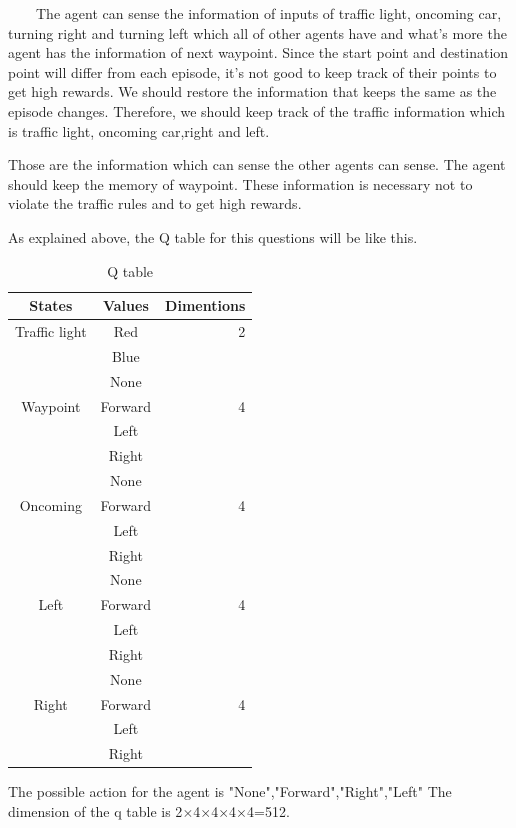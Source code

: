 \documentclass[a4paper,11pt]{article}
\begin{document}
\ \ \ \ The agent can sense the information of inputs of traffic light, oncoming car, turning right and turning left which all of other agents have and what's more the agent has the information of next waypoint.
Since the start point and destination point will differ from each episode, it's not good to keep track of their points to get high rewards.
We should restore the information that keeps the same as the episode changes. Therefore, we should keep track of the traffic information which is traffic light, oncoming car,right and left. 
\par Those are the information which can sense the other agents can sense. The agent should keep the memory of waypoint. These information is necessary not to violate the traffic rules and to get high rewards.

As explained above, the Q table for this questions will be like this.

\begin{table}[H]
\begin{center}
\caption{Q table}
\begin{tabular}{|c|c|r|} \hline
States & Values & Dimentions  \\ \hline
Traffic light & Red &2 \\ 
 & Blue & \\ \hline
 & None & \\
Waypoint &Forward &4\\
 &Left &\\
 & Right &\\ \hline
 & None & \\
 Oncoming&Forward &4\\
 &Left &\\
 & Right &\\ \hline
 & None & \\
 Left&Forward &4\\
 &Left &\\
 & Right &\\ \hline
 & None & \\
Right &Forward &4\\
 &Left &\\
 & Right &\\ \hline

\end{tabular}
\end{center}
\end{table}

The possible action for the agent is "None","Forward","Right","Left"
The dimension of the q table is 2$\times$4$\times$4$\times$4$\times$4=512.
\end{document}
